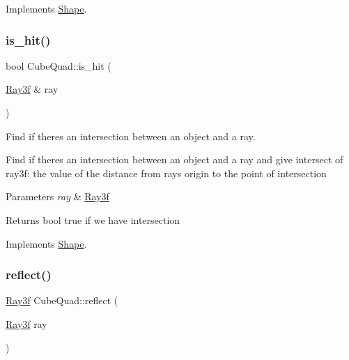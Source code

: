 Implements \mbox{\hyperlink{class_shape_aae1d31ff6fb4237397bf11afd07d7e48}{Shape}}.

\mbox{\label{class_cube_quad_a8d55228ceeed7ce319bc6d8fe8f6b67f}} 
\subsubsection{\texorpdfstring{is\+\_\+hit()}{is\_hit()}}
{\footnotesize\ttfamily bool Cube\+Quad\+::is\+\_\+hit (\begin{DoxyParamCaption}\item[{\mbox{\hyperlink{class_ray3f}{Ray3f}} \&}]{ray }\end{DoxyParamCaption})\hspace{0.3cm}{\ttfamily [virtual]}}



Find if there\textquotesingle{}s an intersection between an object and a ray. 

Find if there\textquotesingle{}s an intersection between an object and a ray and give intersect of ray3f\+: the value of the distance from ray\textquotesingle{}s origin to the point of intersection 
\begin{DoxyParams}{Parameters}
{\em ray} & \mbox{\hyperlink{class_ray3f}{Ray3f}} \\
\hline
\end{DoxyParams}
\begin{DoxyReturn}{Returns}
bool true if we have intersection 
\end{DoxyReturn}


Implements \mbox{\hyperlink{class_shape_ab443b81b74cfb1d248d23cc049da7ddd}{Shape}}.

\mbox{\label{class_cube_quad_a18ef5943f0cfd8b9b72950211691314a}} 
\subsubsection{\texorpdfstring{reflect()}{reflect()}}
{\footnotesize\ttfamily \mbox{\hyperlink{class_ray3f}{Ray3f}} Cube\+Quad\+::reflect (\begin{DoxyParamCaption}\item[{\mbox{\hyperlink{class_ray3f}{Ray3f}}}]{ray }\end{DoxyParamCaption})\hspace{0.3cm}{\ttfamily [virtual]}}



